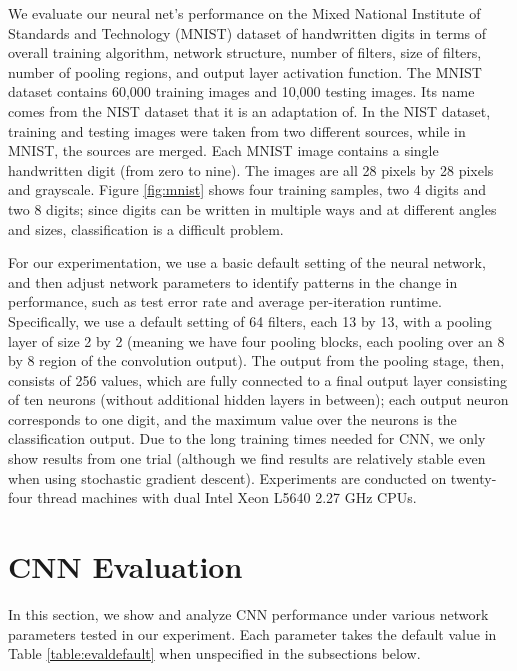\documentclass[10pt,twocolumn]{article}
\begin{document}
We evaluate our neural net's performance on the Mixed National Institute of Standards and Technology (MNIST) dataset of handwritten digits \cite{mnist} in terms of overall training algorithm, network structure, number of filters, size of filters, number of pooling regions, and output layer activation function. The MNIST dataset contains 60,000 training images and 10,000 testing images. Its name comes from the NIST dataset that it is an adaptation of. In the NIST dataset, training and testing images were taken from two different sources, while in MNIST, the sources are merged. Each MNIST image contains a single handwritten digit (from zero to nine). The images are all 28 pixels by 28 pixels and grayscale. Figure \ref{fig:mnist} shows four training samples, two 4 digits and two 8 digits; since digits can be written in multiple ways and at different angles and sizes, classification is a difficult problem.

For our experimentation, we use a basic default setting of the neural network, and then adjust network parameters to identify patterns in the change in performance, such as test error rate and average per-iteration runtime. Specifically, we use a default setting of 64 filters, each 13 by 13, with a pooling layer of size 2 by 2 (meaning we have four pooling blocks, each pooling over an 8 by 8 region of the convolution output). The output from the pooling stage, then, consists of 256 values, which are fully connected to a final output layer consisting of ten neurons (without additional hidden layers in between); each output neuron corresponds to one digit, and the maximum value over the neurons is the classification output. Due to the long training times needed for CNN, we only show results from one trial (although we find results are relatively stable even when using stochastic gradient descent). Experiments are conducted on twenty-four thread machines with dual Intel Xeon L5640 2.27 GHz CPUs.

\section{CNN Evaluation} \label{sec:evalcnn}

In this section, we show and analyze CNN performance under various network parameters tested in our experiment. Each parameter takes the default value in Table \ref{table:evaldefault} when unspecified in the subsections below.
\end{document}

